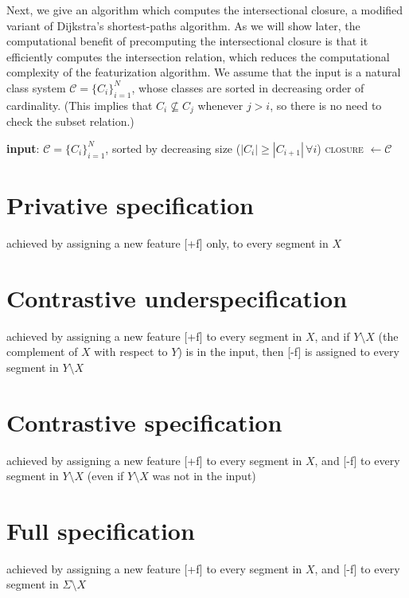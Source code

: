 \documentclass[11pt, oneside]{article}   	%
\begin{document}
\vspace{\baselineskip} Next, we give an algorithm which computes the intersectional closure, a modified variant of Dijkstra's shortest-paths algorithm. As we will show later, the computational benefit of precomputing the intersectional closure is that it efficiently computes the intersection relation, which reduces the computational complexity of the featurization algorithm. We assume that the input is a natural class system $\mathcal C = \{C_i\}_{i=1}^N$, whose classes are sorted in decreasing order of cardinality. (This implies that $C_i \nsubseteq C_j$ whenever $j > i$, so there is no need to check the subset relation.)

\vspace{\baselineskip} \begin{algorithmic}
    \STATE \textbf{input}: $\mathcal C = \{C_i\}_{i=1}^N$, sorted by decreasing size ($|C_i| \geq |C_{i+1}| \, \forall i$)
    \STATE \textsc{closure} $\leftarrow \mathcal C$
\end{algorithmic}

\section{Privative specification}
achieved by assigning a new feature [+f] only, to every segment in $X$

\section{Contrastive underspecification}
achieved by assigning a new feature [+f] to every segment in $X$, and if $Y \setminus X$ (the complement of $X$ with respect to $Y$) is in the input, then [-f] is assigned to every segment in $Y \setminus X$

\section{Contrastive specification}
achieved by assigning a new feature [+f] to every segment in $X$, and [-f] to every segment in $Y \setminus X$ (even if $Y \setminus X$ was not in the input)

\section{Full specification}
achieved by assigning a new feature [+f] to every segment in $X$, and [-f] to every segment in $\Sigma \setminus X$
\end{document}
